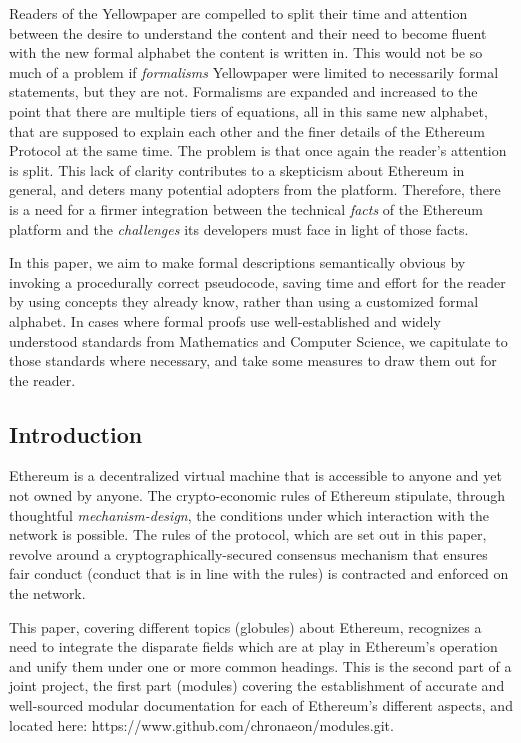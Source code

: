 \documentclass[11pt,a4paper,leqno,bibliography=totoc]{scrartcl}
\newenvironment{alphafootnotes}
    {\par\edef\savedfootnotenumber{\number\value{footnote}}
    \renewcommand{\thefootnote}{\alph{footnote}}
     \setcounter{footnote}{0}}
    {\par\setcounter{footnote}{\savedfootnotenumber}}
\begin{document}
\begin{alphafootnotes}
	  Readers of the Yellowpaper are compelled to split their time and attention between the desire to understand the content and their need to become fluent with the new formal alphabet the content is written in. This would not be so much of a problem if \textit{formalisms} Yellowpaper were limited to necessarily formal statements, but they are not. Formalisms are expanded and increased to the point that there are multiple tiers of equations, all in this same new alphabet, that are supposed to explain each other and the finer details of the Ethereum Protocol at the same time. The problem is that once again the reader's attention is split. This lack of clarity contributes to a skepticism about Ethereum in general, and deters many potential adopters from the platform. Therefore, there is a need for a firmer integration between the technical \textsl{facts} of the Ethereum platform and the \textsl{challenges} its developers must face in light of those facts.
\par

	  In this paper, we aim to make formal descriptions semantically obvious by invoking a procedurally correct pseudocode, saving time and effort for the reader by using concepts they already know, rather than using a customized formal alphabet. In cases where formal proofs use well-established and widely understood standards from Mathematics and Computer Science, we capitulate to those standards where necessary, and take some measures to draw them out for the reader.  
\begin{multicols}{2}
\justify
	\section{Introduction}

	Ethereum is a decentralized virtual machine that is accessible to anyone and yet not owned by anyone. The crypto-economic rules of Ethereum stipulate, through thoughtful \textit{mechanism-design}, the conditions under which interaction with the network is possible. The rules of the protocol, which are set out in this paper, revolve around a cryptographically-secured consensus mechanism that ensures fair conduct (conduct that is in line with the rules) is contracted and enforced on the network. 

	This paper, covering different topics (globules) about Ethereum, recognizes a need to integrate the disparate fields which are at play in Ethereum's operation and unify them under one or more common headings. This is the second part of a joint project, the first part (modules) covering the establishment of accurate and well-sourced modular documentation for each of Ethereum's different aspects, and located here: https://www.github.com/chronaeon/modules.git.



\end{multicols}
\end{alphafootnotes}
\end{document}
